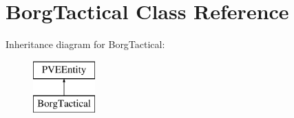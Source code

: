 \hypertarget{classBorgTactical}{
\section{BorgTactical Class Reference}
\label{d0/d4e/classBorgTactical}
}
Inheritance diagram for BorgTactical:\begin{figure}[H]
\begin{center}
\leavevmode
\includegraphics[height=2cm]{d0/d4e/classBorgTactical}
\end{center}
\end{figure}
